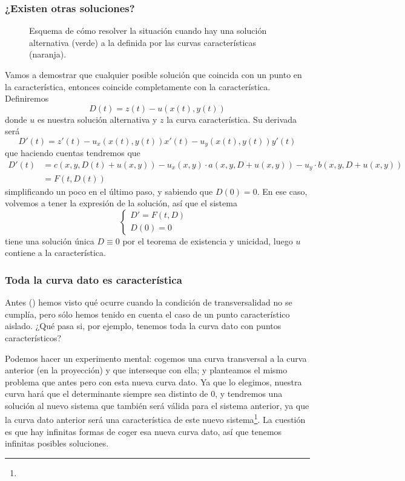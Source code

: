\subsubsection{¿Existen otras soluciones?}

\begin{figure}[hbtp]
\centering
{}
\caption{Esquema de cómo resolver la situación cuando hay una solución alternativa (verde) a la definida por las curvas características (naranja).}
\label{fig:SolucionesAlternativasCaracteristica}
\end{figure}

Vamos a demostrar que cualquier posible solución que coincida con un punto en la característica, entonces coincide completamente con la característica. Definiremos \[ D(t) = z(t) - u(x(t), y(t))\] donde $u$ es nuestra solución alternativa y $z$ la curva característica. Su derivada será \[ D'(t) = z'(t) - u_x(x(t), y(t)) x'(t) - u_y(x(t), y(t)) y'(t)\] que haciendo cuentas tendremos que \begin{align*} D'(t) &= c(x, y, D(t) + u(x,y)) - u_x(x,y) \cdot a(x,y, D+u(x,y)) - u_y \cdot b(x,y, D + u(x,y)) \\
&= F(t, D(t))
\end{align*} simplificando un poco en el último paso, y sabiendo que $D(0) = 0$. En ese caso, volvemos a tener la expresión de la solución, así que el sistema \[ \begin{cases} D'= F(t,D) & \\ D(0) = 0 & \end{cases} \] tiene una solución única $D \equiv 0$ por el teorema de existencia y unicidad, luego $u$ contiene a la característica.


\subsubsection{Toda la curva dato es característica}

Antes () hemos visto qué ocurre cuando la condición de transversalidad no se cumplía, pero sólo hemos tenido en cuenta el caso de un punto característico aislado. ¿Qué pasa si, por ejemplo, tenemos toda la curva dato con puntos característicos?

Podemos hacer un experimento mental: cogemos una curva transversal a la curva anterior (en la proyección) y que interseque con ella; y planteamos el mismo problema que antes pero con esta nueva curva dato. Ya que lo elegimos, nuestra curva hará que el determinante siempre sea distinto de 0, y tendremos una solución al nuevo sistema que también será válida para el sistema anterior, ya que la curva dato anterior será una característica de este nuevo sistema\footnote{}. La cuestión es que hay infinitas formas de coger esa nueva curva dato, así que tenemos infinitas posibles soluciones.


